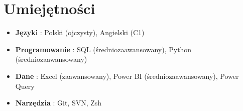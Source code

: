 \documentclass[10pt, letterpaper]{article}
\begin{document}
    \vspace{0.15 cm}
    


    
    \section{Umiejętności}


    \begin{itemize}
        
        \item \textbf{Języki }: Polski (ojczysty), Angielski (C1) 
        
      
        
        \item \textbf{Programowanie }: SQL (średniozaawansowany), Python (średniozaawansowany) 
        
      
        
        \item \textbf{Dane }: Excel (zaawansowany), Power BI (średniozaawansowany), Power Query 
        
      
        
        \item \textbf{Narzędzia }: Git, SVN, Zsh 
        
      \end{itemize}


    
\end{document}
